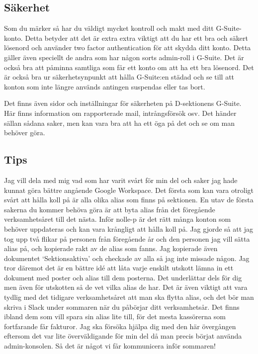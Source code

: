 \documentclass[../testamente_sekreterare_21-22.tex]{subfiles}
\begin{document}
\subsection{Säkerhet}
Som du märker så har du väldigt mycket kontroll och makt med ditt G-Suite-konto. Detta betyder att det är extra extra viktigt att du har ett bra och säkert lösenord och använder two factor authentication för att skydda ditt konto. Detta gäller även speciellt de andra som har någon sorts admin-roll i G-Suite. Det är också bra att påminna samtliga som får ett konto om att ha ett bra lösenord. Det är också bra ur säkerhetsynpunkt att hålla G-Suite:en städad och se till att konton som inte längre används antingen suspendas eller tas bort.

Det finns även sidor och inställningar för säkerheten på D-sektionens G-Suite. Här finns information om rapporterade mail, intrångsförsök osv. Det händer sällan sådana saker, men kan vara bra att ha ett öga på det och se om man behöver göra.


\subsection{Tips}
Jag vill dela med mig vad som har varit svårt för min del och saker jag hade kunnat göra bättre angående Google Workspace. Det första som kan vara otroligt svårt att hålla koll på är alla olika alias som finns på sektionen. En utav de första sakerna du kommer behöva göra är att byta alias från det föregående verksamhetsåret till det nästa. Inför nolle-p är det rätt många konton som behöver uppdateras och kan vara krångligt att hålla koll på. Jag gjorde så att jag tog upp två flikar på personen från föregående år och den personen jag vill sätta alias på, och kopierade rakt av de alias som fanns. Jag kopierade även dokumentet `Sektionsaktiva' och checkade av alla så jag inte missade någon. Jag tror däremot det är en bättre idé att låta varje enskilt utskott lämna in ett dokument med poster och alias till dem posterna. Det underlättar dels för dig men även för utskotten så de vet vilka alias de har. Det är även viktigt att vara tydlig med det tidigare verksamhetsåret att man ska flytta alias, och det bör man skriva i Slack under sommaren när du påbörjar ditt verksamhetsår. Det finns ibland dem som vill spara sin alias lite till, för det mesta kassörerna som fortfarande får fakturor. Jag ska försöka hjälpa dig med den här övergången eftersom det var lite överväldigande för min del då man precis börjat använda admin-konsolen. Så det är något vi får kommunicera inför sommaren!
\end{document}
